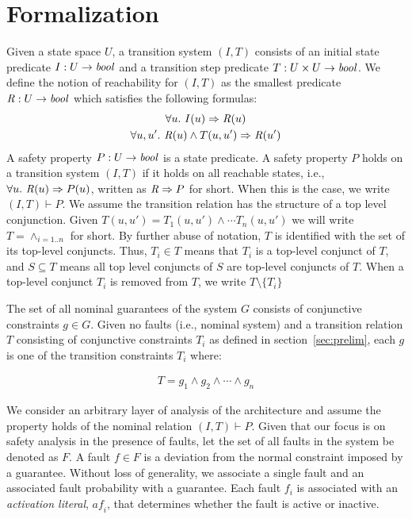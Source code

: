 \section{Formalization}
\label{sec:formalization}
Given a state space $U$, a transition system $(I,T)$ consists of an
initial state predicate $I : U \to \mathit{bool}$ and a transition step
predicate $T : U \times U \to \mathit{bool}$.
We define the notion of
reachability for $(I, T)$ as the smallest predicate $\mathit{R} : U \to
\mathit{bool}$ which satisfies the following formulas:
\begin{gather*}
  \forall u.~ I(u) \Rightarrow \mathit{R}(u) \\
  \forall u, u'.~ \mathit{R}(u) \land T(u, u') \Rightarrow \mathit{R}(u')
\end{gather*}
A safety property $P : U \to \mathit{bool}$ is a state predicate. A safety
property $P$ holds on a transition system $(I, T)$ if it holds on all
reachable states, i.e., $\forall u.~ \mathit{R}(u) \Rightarrow P(u)$,
written as $\mathit{R} \Rightarrow P$ for short. When this is the case, we
write $(I, T)\vdash P$. We assume the transition relation has the structure of a top level conjunction. Given $T(u, u') = T_1(u,u') \land \cdots T_n(u,u')$ we will write $T = \land_{i=1..n}$ for short. By further abuse of notation, $T$ is identified with the set of its top-level conjuncts. Thus, $T_i \in T$ means that $T_i$ is a top-level conjunct of $T$, and $S\subseteq T$ means all top level conjuncts of $S$ are top-level conjuncts of $T$. When a top-level conjunct $T_i$ is removed from $T$, we write $T \setminus \{T_i\}$

The set of all nominal guarantees of the system $G$ consists of conjunctive constraints $g \in G$. Given no faults (i.e., nominal system) and a transition relation $T$ consisting of conjunctive constraints $T_i$ as defined in section~\ref{sec:prelim}, each $g$ is one of the transition constraints $T_i$ where:

\begin{gather}
T = g_1 \land  g_2 \land \cdots \land g_n
\label{eq:Tn}
\end{gather}

We consider an arbitrary layer of analysis of the architecture and assume the property holds of the nominal relation $(I,T) \vdash P$. Given that our focus is on safety analysis in the presence of faults, let the set of all faults in the system be  denoted as $F$. A fault $f \in F$ is a deviation from the normal constraint imposed by a guarantee. Without loss of generality, we associate a single fault and an associated fault probability with a guarantee. Each fault $f_i$ is associated with an \emph{activation literal}, $\mathit{af}_i$, that determines whether the fault is active or inactive. %

